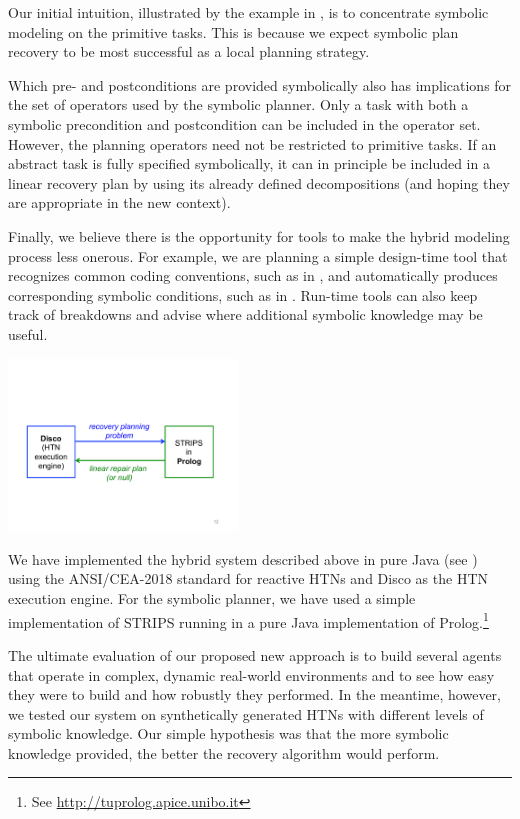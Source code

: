 \documentclass{llncs}
\begin{document}
Our initial intuition, illustrated by the example in
, is to concentrate symbolic modeling on the
primitive tasks.  This is because we expect symbolic plan recovery to
be most successful as a local planning strategy.

Which pre- and postconditions are provided symbolically also has
implications for the set of operators used by the symbolic planner.
Only a task with both a symbolic precondition and postcondition can be
included in the operator set.  However, the planning operators need
not be restricted to primitive tasks.  If an abstract task is fully
specified symbolically, it can in principle be included in a linear
recovery plan by using its already defined decompositions (and hoping
they are appropriate in the new context).

Finally, we believe there is the opportunity for tools to make the
hybrid modeling process less onerous.  For example, we are planning a
simple design-time tool that recognizes common coding conventions,
such as in , and automatically produces corresponding
symbolic conditions, such as in .  Run-time tools can
also keep track of breakdowns and advise where additional symbolic
knowledge may be useful.



\begin{floatingfigure}{2.5in}
\centerline{\includegraphics[width=2.4in]{figs/discolog}}
\end{floatingfigure} 

\noindent We have implemented the hybrid system described above in
pure Java (see ) using the ANSI/CEA-2018 standard
\cite{CETask} for reactive HTNs and Disco \cite{RichSidner2012} as the HTN
execution engine.  For the symbolic planner, we have used a simple
implementation of STRIPS running in a pure Java implementation of
Prolog.\footnote{See \url{http://tuprolog.apice.unibo.it}}

The ultimate evaluation of our proposed new approach is to
build several agents that operate in complex, dynamic real-world
environments and to see how easy they were to build and how robustly
they performed.  In the meantime, however, we tested our system
on synthetically generated HTNs with different levels of symbolic
knowledge.  Our simple hypothesis was that the more symbolic knowledge
provided, the better the recovery algorithm would perform.
\end{document}
